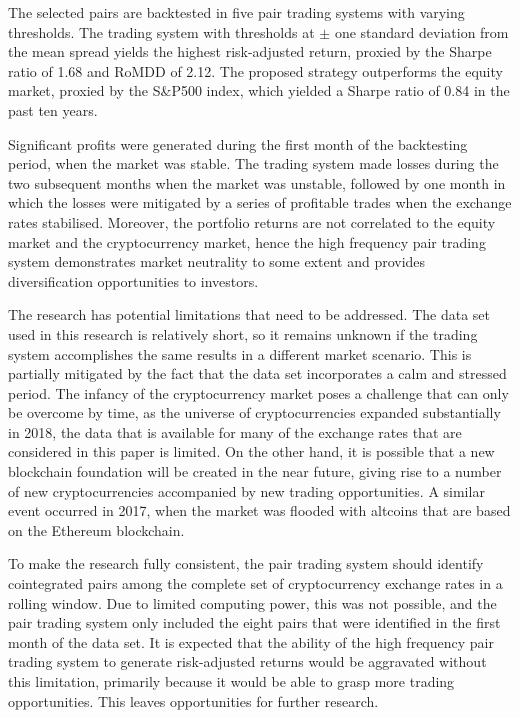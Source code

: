 \documentclass[12pt,english,authoryear]{article}
\begin{document}
The selected pairs are backtested in five pair trading systems with varying thresholds. The trading system with thresholds at $\pm$ one standard deviation from the mean spread yields the highest risk-adjusted return, proxied by the Sharpe ratio of 1.68 and RoMDD of 2.12. The proposed strategy outperforms the equity market, proxied by the S\&P500 index, which yielded a Sharpe ratio of 0.84 in the past ten years. 

Significant profits were generated during the first month of the backtesting period, when the market was stable. The trading system made losses during the two subsequent months when the market was unstable, followed by one month in which the losses were mitigated by a series of profitable trades when the exchange rates stabilised. Moreover, the portfolio returns are not correlated to the equity market and the cryptocurrency market, hence the high frequency pair trading system demonstrates market neutrality to some extent and provides diversification opportunities to investors. 

The research has potential limitations that need to be addressed. The data set used in this research is relatively short, so it remains unknown if the trading system accomplishes the same results in a different market scenario. This is partially mitigated by the fact that the data set incorporates a calm and stressed period. The infancy of the cryptocurrency market poses a challenge that can only be overcome by time, as the universe of cryptocurrencies expanded substantially in 2018, the data that is available for many of the exchange rates that are considered in this paper is limited. On the other hand, it is possible that a new blockchain foundation will be created in the near future, giving rise to a number of new cryptocurrencies accompanied by new trading opportunities. A similar event occurred in 2017, when the market was flooded with altcoins that are based on the Ethereum blockchain.

To make the research fully consistent, the pair trading system should identify cointegrated pairs among the complete set of cryptocurrency exchange rates in a rolling window. Due to limited computing power, this was not possible, and the pair trading system only included the eight pairs that were identified in the first month of the data set. It is expected that the ability of the high frequency pair trading system to generate risk-adjusted returns would be aggravated without this limitation, primarily because it would be able to grasp more trading opportunities. This leaves opportunities for further research. 
\end{document}
